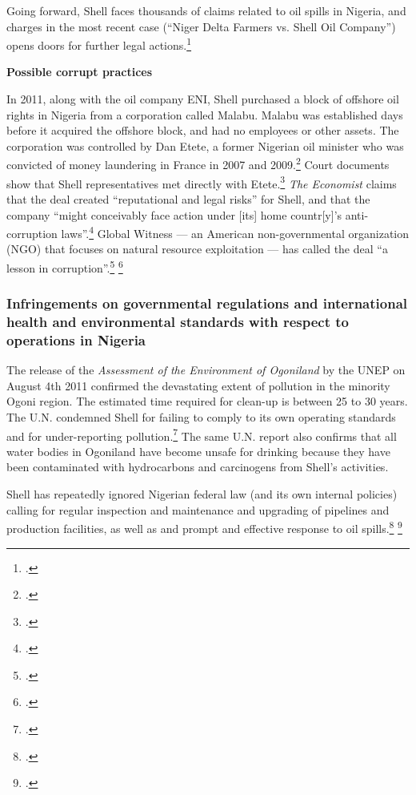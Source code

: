 \documentclass[10pt]{article}
\begin{document}
Going forward, Shell faces thousands of claims related to oil spills in Nigeria, and charges in the most recent case (``Niger Delta Farmers vs. Shell Oil Company'') opens doors for further legal actions.\footcite[][]{MixedVerdict}



\textbf{Possible corrupt practices}



In 2011, along with the oil company ENI, Shell purchased a block of offshore oil rights in Nigeria from a corporation called Malabu.
Malabu was established days before it acquired the offshore block, and had no employees or other assets. 
The corporation was controlled by Dan Etete, a former Nigerian oil minister who was convicted of money laundering in France in 2007 and 2009.\footcite[][]{SafeSexNigeria}
Court documents show that Shell representatives met directly with Etete.\footcite[][]{GWShellKnew}
\emph{The Economist} claims that the deal created ``reputational and legal risks'' for Shell, and that the company ``might conceivably face action under [its] home countr[y]'s anti-corruption laws''.\footcite[][]{SafeSexNigeria}
Global Witness --- an American non-governmental organization (NGO) that focuses on natural resource exploitation --- has called the deal ``a lesson in corruption''.\footcite[See: ][]{GWObscurePayments} \footcite[][]{GWComeClean}




	\subsubsection{Infringements on governmental regulations and international health and environmental standards with respect to operations in Nigeria}
	
	
	
The release of the \emph{Assessment of the Environment of Ogoniland} by the UNEP on August 4th 2011 confirmed the devastating extent of pollution in the minority Ogoni region. 
The estimated time required for clean-up is between 25 to 30 years. 
The U.N. condemned Shell for failing to comply to its own operating standards and for under-reporting pollution.\footcite[][]{Ogoniland}
The same U.N. report also confirms that all water bodies in Ogoniland have become unsafe for drinking because they have been contaminated with hydrocarbons and carcinogens from Shell's activities.



Shell has repeatedly ignored Nigerian federal law (and its own internal policies) calling for regular inspection and maintenance and upgrading of pipelines and production facilities, as well as and prompt and effective response to oil spills.\footcite[][]{Steiner_2008}  \footcite[][]{Steiner_2010}
\end{document}
